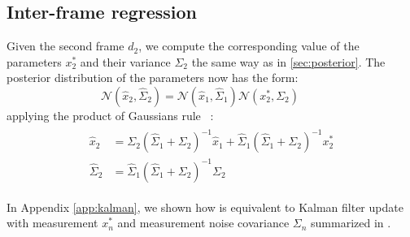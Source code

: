 \subsection{Inter-frame regression} 
\label{sec:combining}

Given the second frame $d_2$, we compute the corresponding value of the parameters $x_2^*$ and their variance $\Sigma_2$ the same way as in \ref{sec:posterior}. The posterior distribution of the parameters now has the form:
% 
\begin{equation}
\mathcal{N}(\hat{x}_2, \hat{\Sigma}_2) = \mathcal{N}(\hat{x}_1, \hat{\Sigma}_1) \mathcal{N}(x_2^*, \Sigma_2) \quad\quad
\end{equation}
% 
applying the product of Gaussians rule ~\cite{petersen2008matrix}:
% 
\begin{align}
\begin{split}
\hat{x}_2 &= \Sigma_2 (\hat{\Sigma}_1 + \Sigma_2)^{-1} \hat{x}_1 + 
\hat{\Sigma}_1 (\hat{\Sigma}_1 + \Sigma_2)^{-1} x_2^*
\\
\hat{\Sigma}_2 &= \hat{\Sigma}_1 (\hat{\Sigma}_1 + \Sigma_2)^{-1} \Sigma_2
\label{eq:combining}
\end{split}
\end{align}

In Appendix \ref{app:kalman}, we shown how  is equivalent to Kalman filter update with measurement $x_n^*$ and measurement noise covariance $\Sigma_n$ summarized in .



